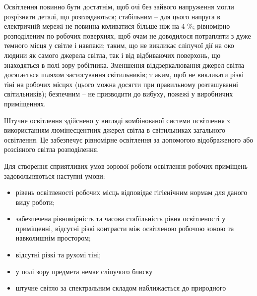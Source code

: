 \documentclass[ukrainian,utf8,simple,floatsubsection, hpadding=5mm,equationsubsection,]{eskdtext}
\begin{document}
Освітлення повинно бути достатнім, щоб очі без зайвого напруження могли розрізняти деталі, що розглядаються; стабільним – 
для цього напруга в електричній мережі не повинна коливатися більше ніж на 4 \%; 
рівномірно розподіленим по робочих поверхнях, щоб очам не доводилося 
потрапляти з дуже темного місця у світле і навпаки; 
таким, що не викликає сліпучої дії на око людини як самого джерела 
світла, так і від відбиваючих поверхонь, що знаходяться в полі зору робітника. 
Зменшення віддзеркалювання джерел світла досягається шляхом застосування світильників; т
аким, щоб не викликати різкі тіні на робочих місцях (цього можна досягти при правильному 
розташуванні світильників); безпечним – не призводити до вибуху, пожежі у виробничих приміщеннях.

Штучне освітлення здійснено у вигляді комбінованої системи освітлення з 
використанням люмінесцентних джерел світла в світильниках загального освітлення. 
Це забезпечує рівномірне освітлення за допомогою відображеного або розсіяного 
світла розподілення.

Для створення сприятливих умов зорової роботи освітлення робочих приміщень задовольняються наступні умови:
\begin{itemize}
 \item рівень освітленості робочих місць відповідає гігієнічним нормам для даного виду роботи;
 \item забезпечена рівномірність та часова стабільність рівня освітленості у приміщенні, відсутні різкі контрасти між освітленою робочою зоною та навколишнім простором;
 \item відсутні різкі та рухомі тіні;
 \item у полі зору предмета немає сліпучого блиску
 \item штучне світло за спектральним складом наближається до природного
\end{itemize}
\end{document}
